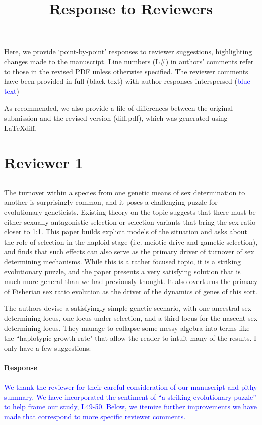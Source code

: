 \documentclass[10pt,letterpaper]{article}
\title{Response to Reviewers}
\date{}
\date{\vspace{-5ex}}
\begin{document}
\maketitle

\noindent
Here, we provide `point-by-point' responses to reviewer suggestions, highlighting changes made to the manuscript. Line numbers (L\#) in authors' comments refer to those in the revised PDF unless otherwise specified. The reviewer comments have been provided in full (black text) with author responses interspersed (\textcolor{blue}{blue text})

As recommended, we also provide a file of differences between the original submission and the revised version (diff.pdf), which was generated using LaTeXdiff.

\section{Reviewer 1}

\noindent\subsection{}

The turnover within a species from one genetic means of sex determination to another is surprisingly common, and it poses a challenging puzzle for evolutionary geneticists.  Existing theory on the topic suggests that there must be either sexually-antagonistic selection or selection variants that bring the sex ratio closer to 1:1.  This paper builds explicit models of the situation and asks about the role of selection in the haploid stage (i.e. meiotic drive and gametic selection), and finds that such effects can also serve as the primary driver of turnover of sex determining mechanisms.  While this is a rather focused topic, it is a striking evolutionary puzzle, and the paper presents a very satisfying solution that is much more general than we had previously thought.  It also overturns the primacy of Fisherian sex ratio evolution as the driver of the dynamics of genes of this sort.

The authors devise a satisfyingly simple genetic scenario, with one ancestral sex-determining locus, one locus under selection, and a third locus for the nascent sex determining locus.  They manage to collapse some messy algebra into terms like the ``haplotypic growth rate" that allow the reader to intuit many of the results.  I only have a few suggestions:

\noindent\paragraph{Response}
\textcolor{blue}{
We thank the reviewer for their careful consideration of our manuscript and pithy summary. We have incorporated the sentiment of ``a striking evolutionary puzzle'' to help frame our study, L49-50. Below, we itemize further improvements we have made that correspond to more specific reviewer comments. 
}
\end{document}
